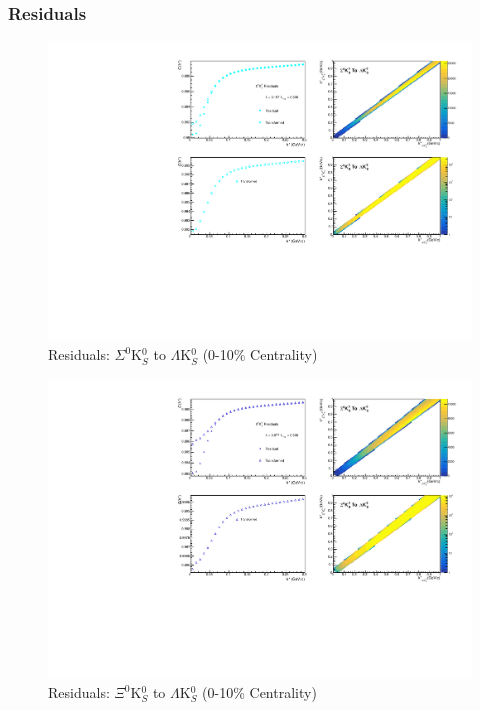 \documentclass[../AnalysisNoteJBuxton.tex]{subfiles}
\begin{document}
\subsubsection{\LamKs Residuals}
\label{Residuals_LamK0}

\begin{figure}[h]
  \centering
  \includegraphics[width=\textwidth]{9_AdditionalFigures/Figures/Residuals/LamK0/Residuals_LamK0_0010_Sig0K0_MomResCrctn_NonFlatBgdCrctn_SingleLamParam_10Res_PrimMaxDecay4fm_UsingXiDataAndCoulombOnly.pdf}
  \caption[Residuals: $\Sigma^{0}$K$^{0}_{S}$ to $\Lambda$K$^{0}_{S}$ (0-10\% Centrality)]{Residuals: $\Sigma^{0}$K$^{0}_{S}$ to $\Lambda$K$^{0}_{S}$ (0-10\% Centrality)}
  \label{fig:Res_LamK0_0010_Sig0K0}
\end{figure}


\begin{figure}[h]
  \centering
  \includegraphics[width=\textwidth]{9_AdditionalFigures/Figures/Residuals/LamK0/Residuals_LamK0_0010_Xi0K0_MomResCrctn_NonFlatBgdCrctn_SingleLamParam_10Res_PrimMaxDecay4fm_UsingXiDataAndCoulombOnly.pdf}
  \caption[Residuals: $\Xi^{0}$K$^{0}_{S}$ to $\Lambda$K$^{0}_{S}$ (0-10\% Centrality)]{Residuals: $\Xi^{0}$K$^{0}_{S}$ to $\Lambda$K$^{0}_{S}$ (0-10\% Centrality)}
  \label{fig:Res_LamK0_0010_Xi0K0}
\end{figure}
\end{document}
